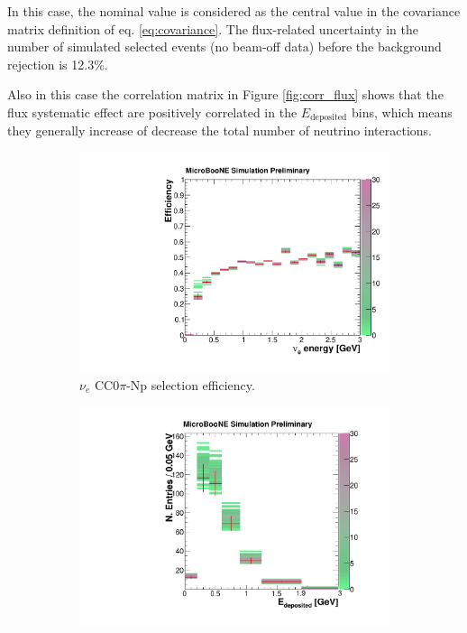 In this case, the nominal value is considered as the central value in the covariance matrix definition of eq. \eqref{eq:covariance}.
The flux-related uncertainty in the number of simulated selected events (no beam-off data) before the background rejection is 12.3\%.

Also in this case the correlation matrix in Figure \ref{fig:corr_flux} shows that the flux systematic effect are positively correlated in the $E_{\mathrm{deposited}}$ bins, which means they generally increase of decrease the total number of neutrino interactions. 

\begin{figure}[htbp]
  \begin{center}
    \begin{subfigure}{0.49\textwidth}
      \includegraphics[width=\linewidth]{figures/eff_ene_flux.pdf}
      \caption{$\nu_{e}$ CC0$\pi$-Np selection efficiency.}  \label{fig:eff_flux}
    \end{subfigure}\hfill
    \begin{subfigure}{0.49\textwidth}
      \vspace{0.5em}
      \includegraphics[width=\linewidth]{figures/reco_flux.pdf}

\end{subfigure}
\end{center}
\end{figure}
